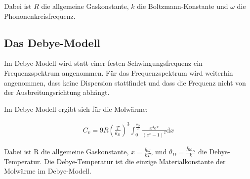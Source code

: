 Dabei ist $R$ die allgemeine Gaskonstante, $k$ die Boltzmann-Konstante und $\omega$ die Phononenkreisfrequenz.

\subsection{Das Debye-Modell}

Im Debye-Modell wird statt einer festen Schwingungsfrequenz ein Frequenzspektrum angenommen.
Für das Frequenzspektrum wird weiterhin angenommen, dass keine Dispersion stattfindet und dass die Frequenz nicht von der Ausbreitungsrichtung abhängt.

Im Debye-Modell ergibt sich für die Molwärme:

\begin{align}
	C_v = 9R \left(\frac{T}{\theta_D}\right)^3 \int_0^\frac{\theta_D}{T} \frac{x^4 e^x}{\left(e^x - 1\right)^2} \mathrm{d}x
\end{align}

Dabei ist R die allgemeine Gaskonstante, $x = \frac{\bar{h} \omega}{kT}$, und $\theta_D = \frac{\bar{h} \omega_D}{k}$ die Debye-Temperatur.
Die Debye-Temperatur ist die einzige Materialkonstante der Molwärme im Debye-Modell.